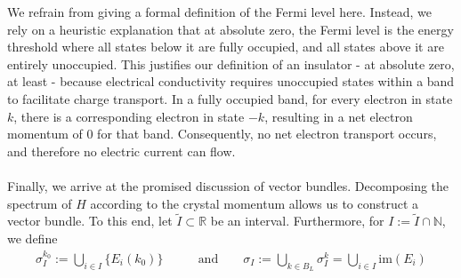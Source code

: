 We refrain from giving a formal definition of the Fermi level here. Instead, we rely on a heuristic explanation that at absolute zero, the Fermi level is the energy threshold where all states below it are fully occupied, and all states above it are entirely unoccupied.
This justifies our definition of an insulator - at absolute zero, at least - because electrical conductivity requires unoccupied states within a band to facilitate charge transport. In a fully occupied band, for every electron in state $k$, there is a corresponding electron in state $-k$, resulting in a net electron momentum of $0$ for that band.
Consequently, no net electron transport occurs, and therefore no electric current can flow.
\\
\\
Finally, we arrive at the promised discussion of vector bundles.
Decomposing the spectrum of $H$ according to the crystal momentum allows us to construct a vector bundle.
To this end, let $\tilde{I} \subset \mathbb{R}$ be an interval.
Furthermore, for $I := \tilde{I} \cap \mathbb{N}$, we define
\begin{align*}
  \sigma_{I}^{k_{0}}
  :=
  \bigcup_{i \in I}
  \lbrace
    E_{i}(k_{0})
  \rbrace
  \qquad
  &\text{and}
  \qquad
  \sigma_{I}
  :=
  \bigcup_{k \in B_{L}}
  \sigma_{I}^{k}
  =
  \bigcup_{i \in I}
  \mathrm{im}(E_{i})
\end{align*}
